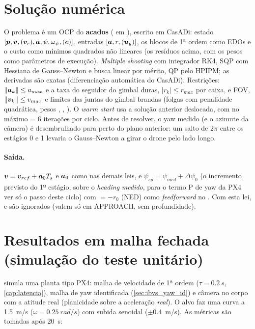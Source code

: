 \section{Solução numérica}
O problema é um OCP do \textbf{acados} ( em
), escrito em CasADi: estado
$[\bm{p},\bm{v},(\bm{v}_r),\bar{\bm{a}},\psi,\omega_\psi,(\bm{c})]$, entradas
$[\bm{a},r,(\bm{u}_g)]$, os blocos de 1ª ordem como EDOs e o custo como mínimos quadrados não
lineares (os resíduos acima, com os pesos como parâmetros de execução). \emph{Multiple shooting}
com integrador RK4, SQP com Hessiana de Gauss--Newton e busca linear por mérito, QP pelo HPIPM; as
derivadas são exatas (diferenciação automática do CasADi). Restrições:
$\|\bm{a}_k\|\le a_{max}$ e a taxa do seguidor do gimbal duras, $|r_k|\le r_{max}$ por caixa, e
FOV, $\|\bm{v}_k\|\le v_{max}$ e limites das juntas do gimbal brandas (folgas com penalidade
quadrática, pesos , , ). O
\emph{warm start} usa a solução anterior deslocada, com no máximo  = 6
iterações por ciclo. Antes de resolver, o yaw medido (e o azimute da câmera) é desembrulhado
para perto do plano anterior: um salto de $2\pi$ entre os estágios 0 e 1 levaria o Gauss--Newton a
girar o drone pelo lado longo.

\paragraph{Saída.} $\bm{v}=\bm{v}_{ref}+\bm{a}_0T_s$ e $\bm{a}_0$ como nas demais leis, e
$\psi_{sp}=\psi_{med}+\Delta\psi_0$ (o incremento previsto do 1º estágio, sobre o \emph{heading}
\emph{medido}, para o termo P de yaw da PX4 ver só o passo deste ciclo) com $=-r_0$ (NED) como \emph{feedforward} no
. Com esta lei,  e  são ignorados
(valem só em APPROACH, sem profundidade).

\section{Resultados em malha fechada (simulação do teste unitário)}
 simula uma planta tipo PX4: malha de velocidade de 1ª ordem
($\tau=\SI{0,2}{s}$, \autoref{cap:latencia}), malha de yaw identificada (\autoref{sec:ibvs_yaw_id}) e câmera
no corpo com a atitude real (planicidade sobre a aceleração \emph{real}). O alvo faz uma curva a
\SI{1,5}{m/s} ($\omega=\SI{0,25}{rad/s}$) com subida senoidal ($\pm$\SI{0,4}{m/s}). As métricas são
tomadas após \SI{20}{s}:

